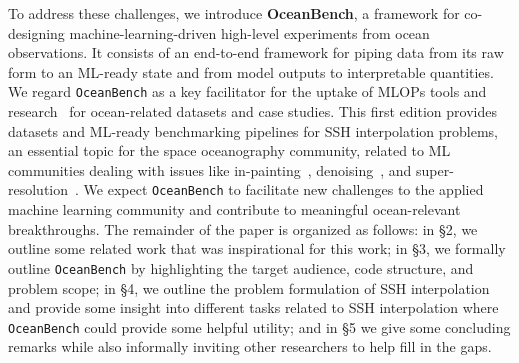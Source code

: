 To address these challenges, we introduce \textbf{OceanBench}, a framework for co-designing machine-learning-driven high-level experiments from ocean observations. 
It consists of an end-to-end framework for piping data from its raw form to an ML-ready state and from model outputs to interpretable quantities. 
We regard \texttt{OceanBench} as a key facilitator for the uptake of MLOPs tools and research~\cite{MLOPS1,MLOPS2} for ocean-related datasets and case studies. This first edition provides datasets and ML-ready benchmarking pipelines for SSH interpolation problems, an essential topic for the space oceanography community, related to ML communities dealing with issues like in-painting~\cite{InPaintingSurvey}, denoising~\cite{DENOISESURVEY,DENOISESURVEY2}, and super-resolution~\cite{SuperResSurvey}. 
We expect \texttt{OceanBench} to facilitate new challenges to the applied machine learning community and contribute to meaningful ocean-relevant breakthroughs.
%
The remainder of the paper is organized as follows: in \S2, we outline some related work that was inspirational for this work; in \S3, we formally outline \texttt{OceanBench} by highlighting the target audience, code structure, and problem scope; in \S4, we outline the problem formulation of SSH interpolation and provide some insight into different tasks related to SSH interpolation where \texttt{OceanBench} could provide some helpful utility; and in \S5 we give some concluding remarks while also informally inviting other researchers to help fill in the gaps.






